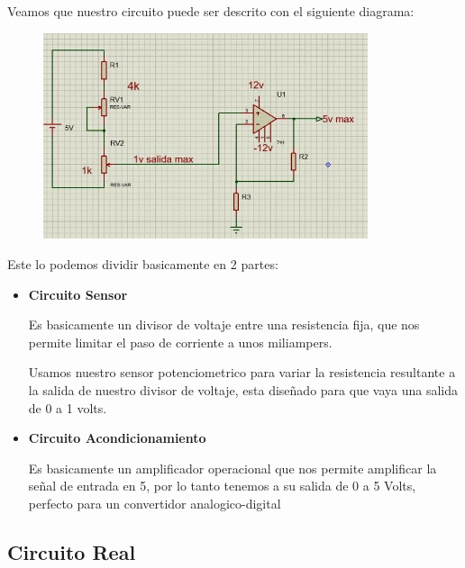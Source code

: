 \documentclass[12pt, fleqn]{article}                            %
\theoremstyle{break}                                            %
\begin{document}
        Veamos que nuestro circuito puede ser descrito con el siguiente diagrama:
        \begin{figure}[h]
            \centering
            \includegraphics[width=0.85\textwidth]{Diagrama3}
        \end{figure}

        Este lo podemos dividir basicamente en 2 partes:
        \begin{itemize}
            \item 
                \textbf{Circuito Sensor}

                Es basicamente un divisor de voltaje entre una resistencia fija, que
                nos permite limitar el paso de corriente a unos miliampers.

                Usamos nuestro sensor potenciometrico para variar la resistencia
                resultante a la salida de nuestro divisor de voltaje, esta diseñado para 
                que vaya una salida de 0 a 1 volts.


            \item 
                \textbf{Circuito Acondicionamiento}

                Es basicamente un amplificador operacional que nos permite amplificar la señal
                de entrada en 5, por lo tanto tenemos a su salida de 0 a 5 Volts, perfecto
                para un convertidor analogico-digital

        \end{itemize}


    \clearpage
    \subsection{Circuito Real}
\end{document}
